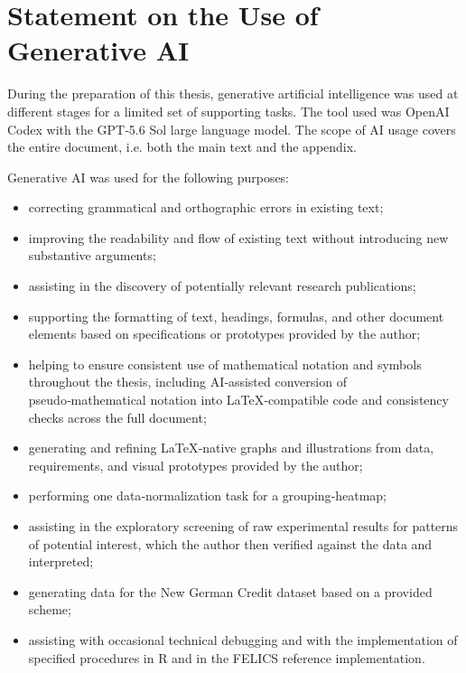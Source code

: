 \section*{Statement on the Use of Generative AI}

\begingroup
\small
\setlength{\parskip}{0.35em}

During the preparation of this thesis, generative artificial intelligence was
used at different stages for a limited set of supporting tasks. The tool used
was OpenAI Codex with the GPT‑5.6 Sol large language model.
The scope of AI usage covers the entire document, i.e. both the main text and
the appendix.

Generative AI was used for the following purposes:

\begin{itemize}[leftmargin=1.5em,itemsep=0.1em,topsep=0.25em,parsep=0pt]
	\item correcting grammatical and orthographic errors in existing text;
	\item improving the readability and flow of existing text without
	      introducing new substantive arguments;
	\item assisting in the discovery of potentially relevant research
	      publications;
	\item supporting the formatting of text, headings, formulas, and other
	      document elements based on specifications or prototypes provided by
	      the author;
	\item helping to ensure consistent use of mathematical notation and symbols
	      throughout the thesis, including AI‑assisted conversion of
	      pseudo‑mathematical notation into LaTeX‑compatible code and consistency checks across the full document;
	\item generating and refining LaTeX‑native graphs and illustrations from
	      data, requirements, and visual prototypes provided by the author;
	\item performing one data‑normalization task for a grouping‑heatmap;
	\item assisting in the exploratory screening of raw experimental results
	      for patterns of potential interest, which the author then verified
	      against the data and interpreted;
	\item generating data for the New German Credit dataset based on a provided
	      scheme;
	\item assisting with occasional technical debugging and with the
	      implementation of specified procedures in R and in the FELICS
	      reference implementation.
\end{itemize}

